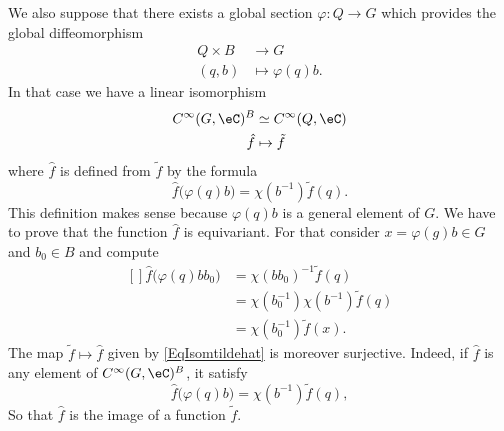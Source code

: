 We also suppose that there exists a global section $\varphi\colon Q\to G$ which provides the global diffeomorphism
\begin{equation}
	\begin{aligned}
		Q\times B&\to G \\
		(q,b)&\mapsto \varphi(q)b. 
	\end{aligned}
\end{equation}
In that case we have a linear isomorphism
\begin{equation}		\label{EqIsomTildeHat}
	\begin{aligned}
		C^{\infty}(G,\eC)^B&\simeq  C^{\infty}(Q,\eC) \\
		\hat f&\mapsto \tilde f 
	\end{aligned}
\end{equation}
where $\hat f$ is defined from $\tilde f$ by the formula
\begin{equation}		\label{EqIsomtildehat}
	\hat f\big( \varphi(q)b \big)=\chi(b^{-1})\tilde f(q).
\end{equation}
This definition makes sense because $\varphi(q)b$ is a general element of $G$. We have to prove that the function $\hat f$ is equivariant. For that consider $x=\varphi(g)b\in G$ and $b_0\in B$ and compute
\begin{equation}
	\begin{aligned}[]
		\hat f\big( \varphi(q)bb_0 \big)&=\chi(bb_0)^{-1}\tilde f(q)\\
		&=\chi(b_0^{-1})\chi(b^{-1})\tilde f(q)\\
		&=\chi(b_0^{-1})\tilde f(x).
	\end{aligned}
\end{equation}
The map $\tilde f\mapsto\hat f$ given by \eqref{EqIsomtildehat} is moreover surjective. Indeed, if $\hat f$ is any element of $ C^{\infty}(G,\eC)^B$, it satisfy
\begin{equation}
	\hat f\big( \varphi(q)b \big)=\chi(b^{-1})\tilde f(q),
\end{equation}
So that $\hat f$ is the image of a function $\tilde f$.

